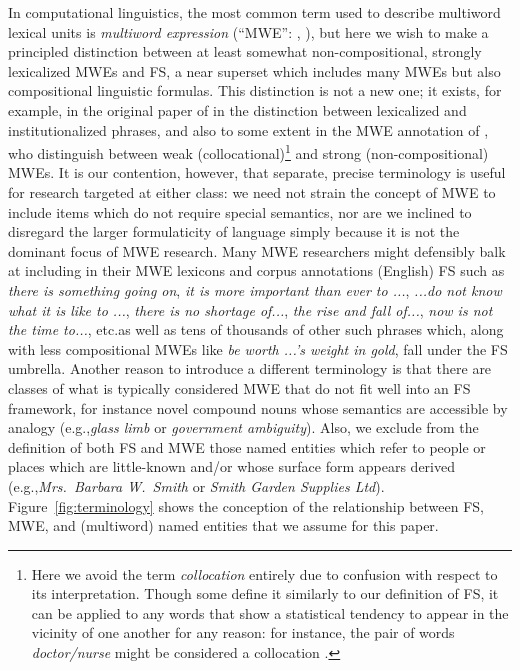 \documentclass[11pt,letterpaper]{article}
\makeatletter
\def \eg {e.g.,\@ }
\def \etc {etc.\@ }
\newcommand{\dotts}{...}
\newcommand{\ex}[1]{\textit{#1}\xspace}
\newcommand{\figref}[2][]{Figure#1~\ref{#2}\xspace}
\makeatother
\begin{document}
In computational linguistics, the most common term used to describe multiword lexical units is \emph{multiword expression} (``MWE'': , ), but here we wish to make a principled distinction between at least somewhat non-compositional, strongly lexicalized MWEs and FS, a near superset which includes many MWEs but also compositional linguistic formulas. This distinction is not a new one; it exists, for example, in the original paper of  in the distinction between lexicalized and institutionalized phrases, and also to some extent in the MWE annotation of , who distinguish between weak (collocational)\footnote{Here we avoid the term \emph{collocation} entirely due to confusion with respect to its interpretation. Though some define it similarly to our definition of FS, it can be applied to any words that show a statistical tendency to appear in the vicinity of one another for any reason: for instance, the pair of words \ex{doctor/nurse} might be considered a collocation \cite{Ramisch14}.}  and strong (non-compositional) MWEs. It is our contention, however, that separate, precise terminology is useful for research targeted at either class: we need not strain the concept of MWE to include items which do not require special semantics, nor are we inclined to disregard the larger formulaticity of language simply because it is not the dominant focus of MWE research. Many MWE researchers might defensibly balk at including in their MWE lexicons and corpus annotations (English) FS such as \ex{there is something going on}, \ex{it is more important than ever to \dotts}, \ex{\dotts do not know what it is like to \dotts}, \ex{there is no shortage of\dotts}, \ex{the rise and fall of\dotts}, \ex{now is not the time to\dotts}, \etc as well as tens of thousands of other such phrases which, along with less compositional MWEs like \ex{be worth \dotts's weight in gold}, fall under the FS umbrella. Another reason to introduce a different terminology is that there are classes of what is typically considered MWE that do not fit well into an FS framework, for instance novel compound nouns whose semantics are accessible by analogy (\eg \ex{glass limb} or \ex{government ambiguity}). Also, we exclude from the definition of both FS and MWE those named entities which refer to people or places which are little-known and/or whose surface form appears derived (\eg \ex{Mrs.\ Barbara W.\ Smith} or \ex{Smith Garden Supplies Ltd}). \figref{fig:terminology} shows the conception of the relationship between FS, MWE, and (multiword) named entities that we assume for this paper.
\end{document}

